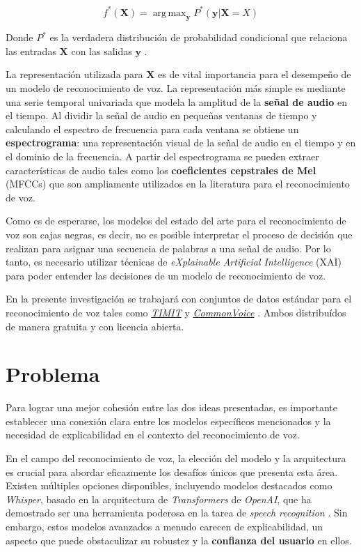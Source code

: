 \documentclass[conference]{IEEEtran}
\DeclareMathOperator*{\argmax}{arg\,max}
\begin{document}
\begin{equation}
    f^\ast(\mathbf{X}) = \argmax_{\mathbf{y}} P^\ast(\mathbf{y}| \mathbf{X} = X)
\end{equation}

Donde $P^\ast$ es la verdadera distribución de probabilidad condicional que relaciona las entradas $\mathbf{X}$ con las salidas $\mathbf{y}$ \cite{Goodfellow-et-al-2016}.

La representación utilizada para $\mathbf{X}$ es de vital importancia para el desempeño de un modelo de reconocimiento de voz. La representación más simple es mediante una serie temporal univariada que modela la amplitud de la \textbf{señal de audio} en el tiempo. Al dividir la señal de audio en pequeñas ventanas de tiempo y calculando el espectro de frecuencia para cada ventana se obtiene un \textbf{espectrograma}: una representación visual de la señal de audio en el tiempo y en el dominio de la frecuencia. A partir del espectrograma se pueden extraer características de audio tales como los \textbf{coeficientes cepstrales de Mel} (MFCCs) que son ampliamente utilizados en la literatura para el reconocimiento de voz.

Como es de esperarse, los modelos del estado del arte para el reconocimiento de voz son cajas negras, es decir, no es posible interpretar el proceso de decisión que realizan para asignar una secuencia de palabras a una señal de audio.  Por lo tanto, es necesario utilizar técnicas de \textit{eXplainable Artificial Intelligence} (XAI) para poder entender las decisiones de un modelo de reconocimiento de voz.

En la presente investigación se trabajará con conjuntos de datos estándar para el reconocimiento de voz tales como  \href{https://catalog.ldc.upenn.edu/LDC93S1}{\textit{TIMIT}} \cite{timit} y \href{https://commonvoice.mozilla.org/en/datasets}{\textit{CommonVoice}} \cite{DBLP:journals/corr/abs-1912-06670}. Ambos distribuídos de manera gratuita y con licencia abierta.

\section{Problema}

Para lograr una mejor cohesión entre las dos ideas presentadas, es importante establecer una conexión clara entre los modelos específicos mencionados y la necesidad de explicabilidad en el contexto del reconocimiento de voz.

En el campo del reconocimiento de voz, la elección del modelo y la arquitectura es crucial para abordar eficazmente los desafíos únicos que presenta esta área. Existen múltiples opciones disponibles, incluyendo modelos destacados como \textit{Whisper}, basado en la arquitectura de \textit{Transformers} de \textit{OpenAI}, que ha demostrado ser una herramienta poderosa en la tarea de \textit{speech recognition} \cite{radford2022robust}. Sin embargo, estos modelos avanzados a menudo carecen de explicabilidad, un aspecto que puede obstaculizar su robustez y la \textbf{confianza del usuario} en ellos.
\end{document}
